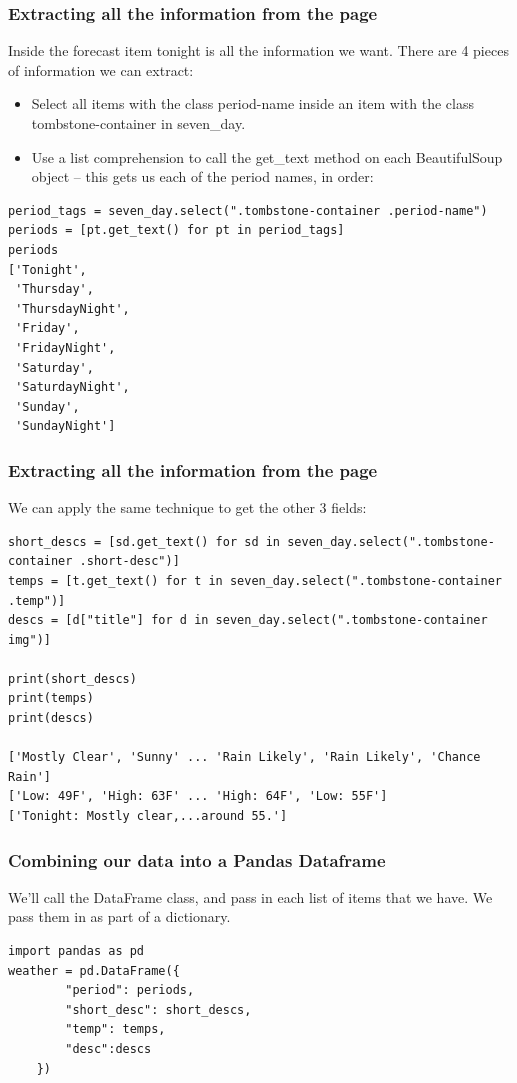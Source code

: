 \begin{frame}[fragile]\frametitle{Extracting all the information from the page}
Inside the forecast item tonight is all the information we want. There are 4 pieces of information we can extract:
     \begin{itemize}
    \item    Select all items with the class period-name inside an item with the class tombstone-container in seven\_day.
    \item        Use a list comprehension to call the get\_text method on each BeautifulSoup object -- this gets us each of the period names, in order:
	    \end{itemize}
	                \begin{lstlisting}
period_tags = seven_day.select(".tombstone-container .period-name")
periods = [pt.get_text() for pt in period_tags]
periods
['Tonight',
 'Thursday',
 'ThursdayNight',
 'Friday',
 'FridayNight',
 'Saturday',
 'SaturdayNight',
 'Sunday',
 'SundayNight']
\end{lstlisting}
\end{frame}


\begin{frame}[fragile]\frametitle{Extracting all the information from the page}
We can apply the same technique to get the other 3 fields:

	                \begin{lstlisting}
short_descs = [sd.get_text() for sd in seven_day.select(".tombstone-container .short-desc")]
temps = [t.get_text() for t in seven_day.select(".tombstone-container .temp")]
descs = [d["title"] for d in seven_day.select(".tombstone-container img")]

print(short_descs)
print(temps)
print(descs)

['Mostly Clear', 'Sunny' ... 'Rain Likely', 'Rain Likely', 'Chance Rain']
['Low: 49F', 'High: 63F' ... 'High: 64F', 'Low: 55F']
['Tonight: Mostly clear,...around 55.']
\end{lstlisting}
\end{frame}

\begin{frame}[fragile]\frametitle{Combining our data into a Pandas Dataframe}
We'll call the DataFrame class, and pass in each list of items that we have. We pass them in as part of a dictionary.

	                \begin{lstlisting}
import pandas as pd
weather = pd.DataFrame({
        "period": periods, 
        "short_desc": short_descs, 
        "temp": temps, 
        "desc":descs
    })

\end{lstlisting}
\end{frame}

